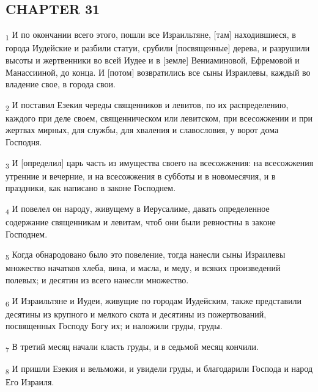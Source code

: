 \subsection{CHAPTER 31}
\begin{tcolorbox}
\textsubscript{1} И по окончании всего этого, пошли все Израильтяне, [там] находившиеся, в города Иудейские и разбили статуи, срубили [посвященные] дерева, и разрушили высоты и жертвенники во всей Иудее и в [земле] Вениаминовой, Ефремовой и Манассииной, до конца. И [потом] возвратились все сыны Израилевы, каждый во владение свое, в города свои.
\end{tcolorbox}
\begin{tcolorbox}
\textsubscript{2} И поставил Езекия череды священников и левитов, по их распределению, каждого при деле своем, священническом или левитском, при всесожжении и при жертвах мирных, для службы, для хваления и славословия, у ворот дома Господня.
\end{tcolorbox}
\begin{tcolorbox}
\textsubscript{3} И [определил] царь часть из имущества своего на всесожжения: на всесожжения утренние и вечерние, и на всесожжения в субботы и в новомесячия, и в праздники, как написано в законе Господнем.
\end{tcolorbox}
\begin{tcolorbox}
\textsubscript{4} И повелел он народу, живущему в Иерусалиме, давать определенное содержание священникам и левитам, чтоб они были ревностны в законе Господнем.
\end{tcolorbox}
\begin{tcolorbox}
\textsubscript{5} Когда обнародовано было это повеление, тогда нанесли сыны Израилевы множество начатков хлеба, вина, и масла, и меду, и всяких произведений полевых; и десятин из всего нанесли множество.
\end{tcolorbox}
\begin{tcolorbox}
\textsubscript{6} И Израильтяне и Иудеи, живущие по городам Иудейским, также представили десятины из крупного и мелкого скота и десятины из пожертвований, посвященных Господу Богу их; и наложили груды, груды.
\end{tcolorbox}
\begin{tcolorbox}
\textsubscript{7} В третий месяц начали класть груды, и в седьмой месяц кончили.
\end{tcolorbox}
\begin{tcolorbox}
\textsubscript{8} И пришли Езекия и вельможи, и увидели груды, и благодарили Господа и народ Его Израиля.
\end{tcolorbox}
